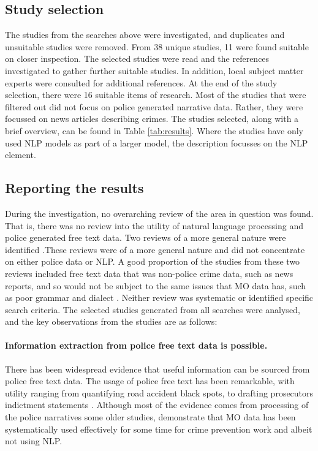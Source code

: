 \subsection{Study selection} The studies from the searches above were investigated, and duplicates and unsuitable studies were removed. From 38 unique studies, 11 were found suitable on closer inspection. The selected studies were read and the references investigated to gather further suitable studies. In addition, local subject matter experts were consulted for additional references. At the end of the study selection, there were 16 suitable items of research. Most of the studies that were filtered out did not focus on police generated narrative data. Rather, they were focussed on news articles describing crimes. The studies selected, along with a brief overview, can be found in Table \ref{tab:results}. Where the studies have only used NLP models as part of a larger model, the description focusses on the NLP element.


\subsection{Reporting the results}

During the investigation, no overarching review of the area in question was found. That is, there was no review into the utility of natural language processing and police generated free text data. Two reviews of a more general nature were identified \parencite{krishnamurthy2012survey, hassani2016review}.These reviews were of a more general nature and did not concentrate on either police data or NLP. A good proportion of the studies from these two reviews included free text data that was non-police crime data, such as news reports, and so would not be subject to the same issues that MO data has, such as poor grammar and dialect  \parencite{Keyvanpour2011872}. Neither review was systematic or identified specific search criteria. The selected studies generated from all searches were analysed, and the key observations from the studies are as follows:

\paragraph{Information extraction from police free text data is possible.} There has been widespread evidence that useful information can be sourced from police free text data. The usage of police free text has been remarkable, with utility ranging from quantifying road accident black spots,\textcite{Krause2019} to drafting prosecutors indictment statements \parencite{chen2010use}. Although most of the evidence comes from processing of the police narratives some older studies, demonstrate that MO data has been systematically used effectively for some time for crime prevention work \textcite{bowers2004commits} and \parencite{adderley2003modus} albeit not using NLP. 


